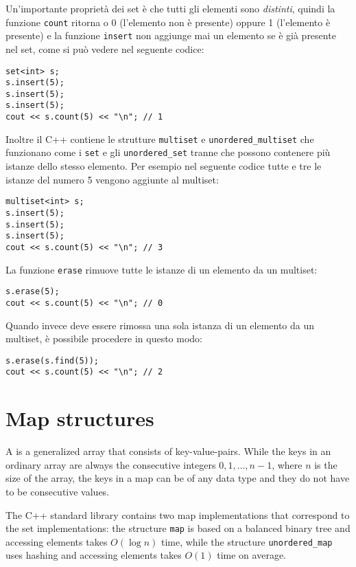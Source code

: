 Un'importante proprietà dei set è che tutti gli elementi
sono \emph{distinti}, quindi la funzione \texttt{count}
ritorna o 0 (l'elemento non è presente) oppure 1 
(l'elemento è presente) e la funzione 
\texttt{insert} non aggiunge mai un elemento
se è già presente nel set, come si può vedere
nel seguente codice:

\begin{lstlisting}
set<int> s;
s.insert(5);
s.insert(5);
s.insert(5);
cout << s.count(5) << "\n"; // 1
\end{lstlisting}

Inoltre il C++ contiene le strutture
\texttt{multiset} e \texttt{unordered\_multiset}
che funzionano come i \texttt{set}
e gli \texttt{unordered\_set}
tranne che possono contenere più istanze dello stesso elemento.
Per esempio nel seguente codice tutte e tre le istanze del
numero 5 vengono aggiunte al multiset:

\begin{lstlisting}
multiset<int> s;
s.insert(5);
s.insert(5);
s.insert(5);
cout << s.count(5) << "\n"; // 3
\end{lstlisting}
La funzione \texttt{erase} rimuove tutte
le istanze di un elemento da un multiset:
\begin{lstlisting}
s.erase(5);
cout << s.count(5) << "\n"; // 0
\end{lstlisting}
Quando invece deve essere rimossa una sola istanza
di un elemento da un multiset,
è possibile procedere in questo modo:
\begin{lstlisting}
s.erase(s.find(5));
cout << s.count(5) << "\n"; // 2
\end{lstlisting}

\section{Map structures}


A  is a generalized array
that consists of key-value-pairs.
While the keys in an ordinary array are always
the consecutive integers $0,1,\ldots,n-1$,
where $n$ is the size of the array,
the keys in a map can be of any data type and
they do not have to be consecutive values.

The C++ standard library contains two map
implementations that correspond to the set
implementations: the structure
\texttt{map} is based on a balanced
binary tree and accessing elements
takes $O(\log n)$ time,
while the structure
\texttt{unordered\_map} uses hashing
and accessing elements takes $O(1)$ time on average.

